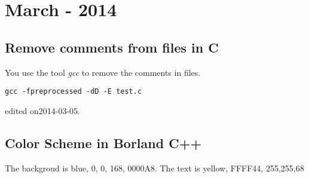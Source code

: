 
\chapter[March - 2014]{March - 2014} %

\label{ch:mar:2014} %

\section{Remove comments from files in C}
You use the tool {\it gcc} to remove the comments in files.
\begin{verbatim}
gcc -fpreprocessed -dD -E test.c
\end{verbatim}

\hfill {\tiny edited on2014-03-05.}

\section{Color Scheme in Borland C++}
The backgroud is blue, 0, 0, 168, 0000A8.
The text is yellow, FFFF44, 255,255,68

